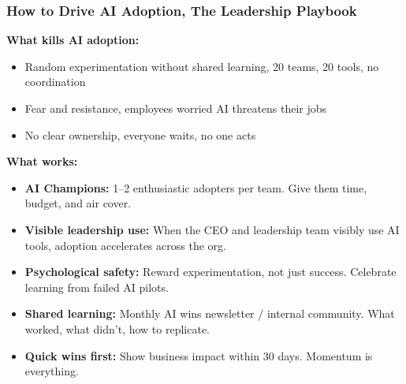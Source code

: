 \begin{frame}[fragile]\frametitle{How to Drive AI Adoption, The Leadership Playbook}

\textbf{What kills AI adoption:}
\begin{itemize}
  \item Random experimentation without shared learning, 20 teams, 20 tools, no coordination
  \item Fear and resistance, employees worried AI threatens their jobs
  \item No clear ownership, everyone waits, no one acts
\end{itemize}

\textbf{What works:}
\begin{itemize}
  \item \textbf{AI Champions:} 1--2 enthusiastic adopters per team. Give them time, budget, and air cover.
  \item \textbf{Visible leadership use:} When the CEO and leadership team visibly use AI tools, adoption accelerates across the org.
  \item \textbf{Psychological safety:} Reward experimentation, not just success. Celebrate learning from failed AI pilots.
  \item \textbf{Shared learning:} Monthly AI wins newsletter / internal community. What worked, what didn't, how to replicate.
  \item \textbf{Quick wins first:} Show business impact within 30 days. Momentum is everything.
\end{itemize}

\end{frame}


